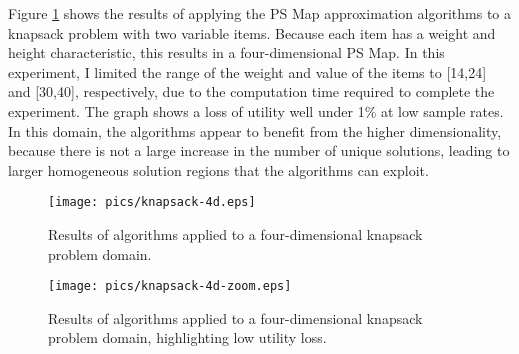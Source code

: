 






Figure \ref{fig:knapsack-4d} shows the results of applying the PS Map approximation algorithms to a knapsack problem with two variable items.  Because each item has a weight and height characteristic, this results in a four-dimensional PS Map.  In this experiment, I limited the range of the weight and value of the items to [14,24] and [30,40], respectively, due to the computation time required to complete the experiment.  The graph shows a loss of utility well under 1\% at low sample rates.  In this domain, the algorithms appear to benefit from the higher dimensionality, because there is not a large increase in the number of unique solutions, leading to larger homogeneous solution regions that the algorithms can exploit.

\begin{figure}
\begin{center}
\texttt{[image: pics/knapsack-4d.eps]}
\caption{Results of algorithms applied to a four-dimensional knapsack problem domain.}
\label{fig:knapsack-4d}
\end{center}
\end{figure}

\begin{figure}
\begin{center}
\texttt{[image: pics/knapsack-4d-zoom.eps]}
\caption{Results of algorithms applied to a four-dimensional knapsack problem domain, highlighting low utility loss.}
\label{fig:knapsack-4d-zoom}
\end{center}
\end{figure}



